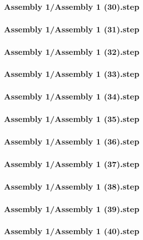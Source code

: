 \documentclass[a4paper,12pt]{article}
\begin{document}
\subsubsection{Assembly 1/Assembly 1 (30).step}

\subsubsection{Assembly 1/Assembly 1 (31).step}

\subsubsection{Assembly 1/Assembly 1 (32).step}

\subsubsection{Assembly 1/Assembly 1 (33).step}

\subsubsection{Assembly 1/Assembly 1 (34).step}

\subsubsection{Assembly 1/Assembly 1 (35).step}

\subsubsection{Assembly 1/Assembly 1 (36).step}

\subsubsection{Assembly 1/Assembly 1 (37).step}

\subsubsection{Assembly 1/Assembly 1 (38).step}

\subsubsection{Assembly 1/Assembly 1 (39).step}

\subsubsection{Assembly 1/Assembly 1 (40).step}

\end{document}
